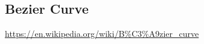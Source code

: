 \documentclass[11pt]{article}
\begin{document}
%
%
%



    \subsection{Bezier Curve}\label{subsec:bezierCurve}
    \href{https://en.wikipedia.org/wiki/B\%C3\%A9zier\_curve}{https://en.wikipedia.org/wiki/B\%C3\%A9zier\_curve}
%
%
%
\end{document}
